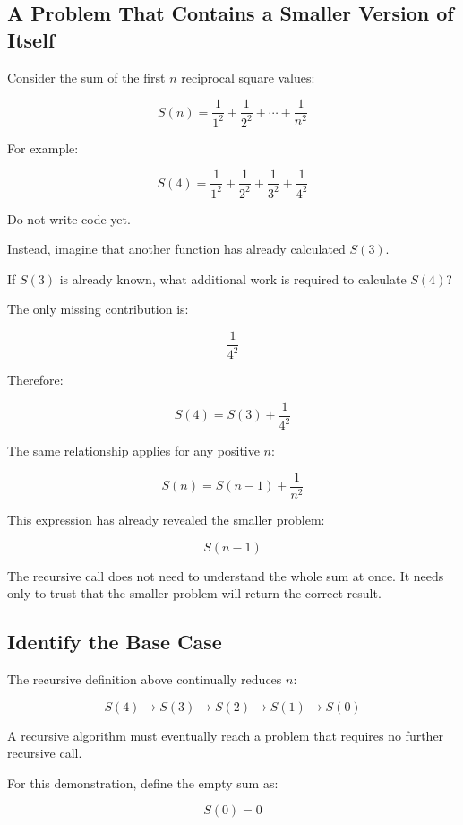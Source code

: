 \documentclass{csc2059practical}
\begin{document}
\subsection{A Problem That Contains a Smaller Version of Itself}

Consider the sum of the first \(n\) reciprocal square values:

\[
S(n)
=
\frac{1}{1^2}
+
\frac{1}{2^2}
+
\cdots
+
\frac{1}{n^2}
\]

For example:

\[
S(4)
=
\frac{1}{1^2}
+
\frac{1}{2^2}
+
\frac{1}{3^2}
+
\frac{1}{4^2}
\]

Do not write code yet.

Instead, imagine that another function has already calculated \(S(3)\).

\begin{engineeringquestion}
If \(S(3)\) is already known, what additional work is required to calculate
\(S(4)\)?
\end{engineeringquestion}

The only missing contribution is:

\[
\frac{1}{4^2}
\]

Therefore:

\[
S(4)
=
S(3)
+
\frac{1}{4^2}
\]

The same relationship applies for any positive \(n\):

\[
S(n)
=
S(n-1)
+
\frac{1}{n^2}
\]

This expression has already revealed the smaller problem:

\[
S(n-1)
\]

The recursive call does not need to understand the whole sum at once. It needs
only to trust that the smaller problem will return the correct result.

\subsection{Identify the Base Case}

The recursive definition above continually reduces \(n\):

\[
S(4) \rightarrow S(3) \rightarrow S(2) \rightarrow S(1) \rightarrow S(0)
\]



A recursive algorithm must eventually reach a problem that requires no further
recursive call.

For this demonstration, define the empty sum as:

\[
S(0)=0
\]
\end{document}
